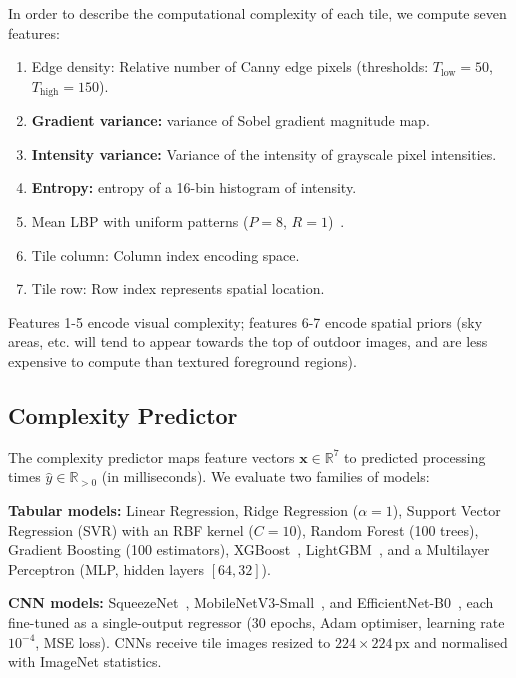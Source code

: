 \documentclass[acmsmall]{acmart}
\begin{document}
In order to describe the computational complexity of each tile, we compute seven features:

\begin{enumerate}
  \item Edge density: Relative number of Canny edge pixels (thresholds: $T_{\text{low}} = 50$, $T_{\text{high}} = 150$).

  \item \textbf{Gradient variance: } variance of Sobel gradient magnitude map.

  \item \textbf{Intensity variance: } Variance of the intensity of grayscale pixel intensities.

  \item \textbf{Entropy: } entropy of a 16-bin histogram of intensity.

  \item Mean LBP with uniform patterns ($P = 8$, $R = 1$)~\cite{Ojala2002}.

  \item Tile column: Column index encoding space.

  \item Tile row: Row index represents spatial location.
\end{enumerate}

Features 1-5 encode visual complexity; features 6-7 encode spatial priors (sky areas, etc. will tend to appear towards the top of outdoor images, and are less expensive to compute than textured foreground regions).

\subsection{Complexity Predictor}

The complexity predictor maps feature vectors $\mathbf{x} \in \mathbb{R}^7$ to predicted processing times $\hat{y} \in \mathbb{R}_{>0}$ (in milliseconds). We evaluate two families of models:

\textbf{Tabular models:} Linear Regression, Ridge Regression ($\alpha=1$), Support Vector Regression (SVR) with an RBF kernel ($C=10$), Random Forest (100 trees), Gradient Boosting (100 estimators), XGBoost~\cite{ChenGuestrin2016}, LightGBM~\cite{Ke2017}, and a Multilayer Perceptron (MLP, hidden layers $[64, 32]$).

\textbf{CNN models:} SqueezeNet~\cite{Iandola2016}, MobileNetV3-Small~\cite{Howard2019}, and EfficientNet-B0~\cite{Tan2019}, each fine-tuned as a single-output regressor (30 epochs, Adam optimiser, learning rate $10^{-4}$, MSE loss). CNNs receive tile images resized to $224\times224$\,px and normalised with ImageNet statistics.
\end{document}
